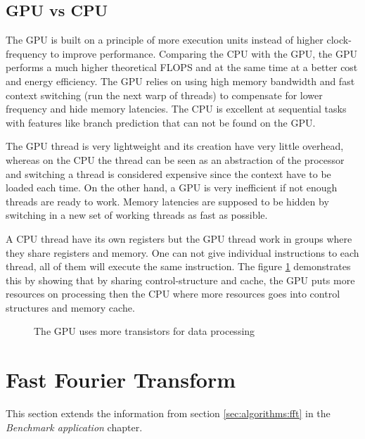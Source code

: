 \subsection{GPU vs CPU}

The \gls{GPU} is built on a principle of more execution units instead of higher clock-frequency to improve performance. Comparing the \gls{CPU} with the \gls{GPU}, the \gls{GPU} performs a much higher theoretical \gls{FLOPS} and at the same time at a better cost and energy efficiency\cite{owens2007survey}. The \gls{GPU} relies on using high memory bandwidth and fast context switching (run the next warp of threads) to compensate for lower frequency and hide memory latencies. The \gls{CPU} is excellent at sequential tasks with features like branch prediction that can not be found on the \gls{GPU}.

The \gls{GPU} thread is very lightweight and its creation have very little overhead, whereas on the \gls{CPU} the thread can be seen as an abstraction of the processor and switching a thread is considered expensive since the context have to be loaded each time. On the other hand, a \gls{GPU} is very inefficient if not enough threads are ready to work. Memory latencies are supposed to be hidden by switching in a new set of working threads as fast as possible.

A \gls{CPU} thread have its own registers but the \gls{GPU} thread work in groups where they share registers and memory. One can not give individual instructions to each thread, all of them will execute the same instruction. The figure \ref{fig:gpu-vs-cpu} demonstrates this by showing that by sharing control-structure and cache, the \gls{GPU} puts more resources on processing then the \gls{CPU} where more resources goes into control structures and memory cache.

\begin{figure}
	\centering
	
	\caption{The \gls{GPU} uses more transistors for data processing}
	\label{fig:gpu-vs-cpu}
\end{figure}

\section{Fast Fourier Transform}

This section extends the information from section \ref{sec:algorithms:fft} in the \textit{Benchmark application} chapter.

\subsection{\CTALG}

